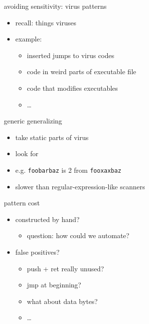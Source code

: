 \begin{frame}{avoiding sensitivity: virus patterns}
    \begin{itemize}
    \item recall: things viruses 
    \item example: 
        \begin{itemize}
        \item inserted jumps to virus codes
        \item code in weird parts of executable file
        \item code that modifies executables
        \item \ldots
        \end{itemize}
    \end{itemize}
\end{frame}

\begin{frame}{generic generalizing}
    \begin{itemize}
    \item take static parts of virus
    \item look for 
    \item e.g. {\tt foobarbaz} is 2 from {\tt fooxaxbaz}
    \item slower than regular-expression-like scanners
    \end{itemize}
\end{frame}

\begin{frame}{pattern cost}
    \begin{itemize}
    \item constructed by hand?
        \begin{itemize}
        \item question: how could we automate?
        \end{itemize}
    \item false positives?
        \begin{itemize}
        \item push + ret really unused?
        \item jmp at beginning?
        \item what about data bytes?
        \item \ldots
        \end{itemize}
    \end{itemize}
\end{frame}

